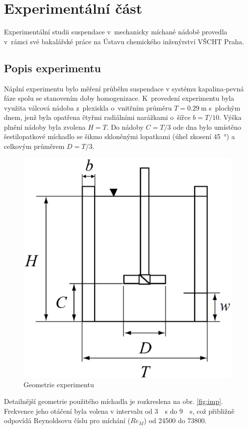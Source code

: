 \chapter{Experimentální část}
Experimentální studii suspendace v~mechanicky míchané nádobě provedla \citet{pav11} v~rámci své bakalářské práce na Ústavu chemického inženýrství VŠCHT Praha.

\section{Popis experimentu}
\label{chap:exp}
Náplní experimentu bylo měření průběhu suspendace v systému kapalina-pevná fáze spolu se stanovením doby homogenizace. K~provedení experimentu byla využita válcová nádoba z~plexiskla o~vnitřním průměru $T=\SI{0.29}{\meter}$ s~plochým dnem, jenž byla opatřena čtyřmi radiálními narážkami o~šířce $b=T/10$. Výška plnění nádoby byla zvolena $H=T$. Do nádoby $C=T/3$ ode dna bylo umístěno šestilopatkové míchadlo se šikmo skloněnými lopatkami (úhel zkosení \SI{45}{\degree}) a celkovým průměrem  $D=T/3$. 
\begin{figure}[h!]
\centering
\includegraphics[scale=0.44]{images/mujedit.eps}
\caption{Geometrie experimentu}
\label{fig:nadoba}
\end{figure} 
Detailnější geometrie použitého míchadla je rozkreslena na obr. \ref{fig:imp}. Frekvence jeho otáčení byla volena v intervalu od \SI{3}{\per\second} do \SI{9}{\per\second}, což přibližně odpovídá Reynoldsovu číslu pro míchání ($Re_{M}$) od \num{24500} do \num{73800}.
